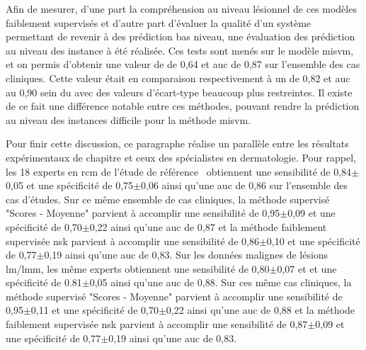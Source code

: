 Afin de mesurer, d'une part la compréhension au niveau lésionnel de ces modèles faiblement supervisés et d'autre part d'évaluer la qualité d'un système permettant de revenir à des prédiction bas niveau, une évaluation des prédiction au niveau des instance à été réalisée. Ces tests sont menés sur le modèle \gls{misvm}, et on permis d'obtenir une valeur de \fscore{} de 0,64 et \gls{auc} de 0,87 sur l'ensemble des cas cliniques. Cette valeur était en comparaison respectivement à un \fscore{} de 0,82 et \gls{auc} au 0,90 sein du  avec des valeurs d'écart-type beaucoup plus restreintes. Il existe de ce fait une différence notable entre ces méthodes, pouvant rendre la prédiction au niveau des instances difficile pour la méthode \gls{misvm}.\par

Pour finir cette discussion, ce paragraphe réalise un parallèle entre les résultats expérimentaux de chapitre et ceux des spécialistes en dermatologie. Pour rappel, les  18 experts en \gls{rcm} de l’étude de référence~\cite{Cinotti2016} obtiennent une sensibilité de 0,84$\pm$0,05 et une spécificité de 0,75$\pm$0,06 ainsi qu'une \gls{auc} de 0,86 sur l'ensemble des cas d'études. Sur ce même ensemble de cas cliniques, la méthode supervisé "Scores - Moyenne" parvient à accomplir une sensibilité de 0,95$\pm$0,09 et une spécificité de 0,70$\pm$0,22 ainsi qu'une \gls{auc} de 0,87 et la méthode faiblement supervisée \gls{nsk} parvient à accomplir une sensibilité de 0,86$\pm$0,10 et une spécificité de 0,77$\pm$0,19 ainsi qu'une \gls{auc} de 0,83. Sur les données malignes de lésions \gls{lm}/\gls{lmm}, les même experts obtiennent une sensibilité de 0,80$\pm$0,07 et et une spécificité de 0.81$\pm$0,05 ainsi qu'une \gls{auc} de 0,88. Sur ces même cas cliniques, la méthode supervisé "Scores - Moyenne" parvient à accomplir une sensibilité de 0,95$\pm$0,11 et une spécificité de 0,70$\pm$0,22 ainsi qu'une \gls{auc} de 0,88 et la méthode faiblement supervisée \gls{nsk} parvient à accomplir une sensibilité de 0,87$\pm$0,09 et une spécificité de 0,77$\pm$0,19 ainsi qu'une \gls{auc} de 0,83.\par